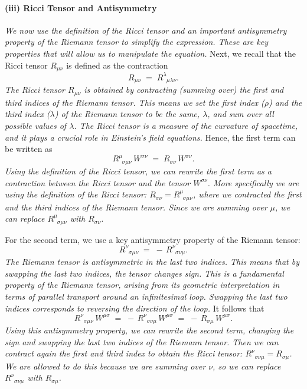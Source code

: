 \paragraph{(iii) Ricci Tensor and Antisymmetry}
\textit{We now use the definition of the Ricci tensor and an important antisymmetry property of the Riemann tensor to simplify the expression. These are key properties that will allow us to manipulate the equation.}
Next, we recall that the Ricci tensor $R_{\mu\nu}$ is defined as the contraction
\[
R_{\mu\nu} \;=\; R^\lambda_{\;\;\mu\lambda\nu}.
\]
\textit{The Ricci tensor \(R_{\mu\nu}\) is obtained by contracting (summing over) the first and third indices of the Riemann tensor. This means we set the first index (\(\rho\)) and the third index (\(\lambda\)) of the Riemann tensor to be the same, \(\lambda\), and sum over all possible values of \(\lambda\). The Ricci tensor is a measure of the curvature of spacetime, and it plays a crucial role in Einstein's field equations.}
Hence, the first term can be written as
\[
R^\mu_{\;\;\sigma\mu\nu}\,W^{\sigma\nu}
\;=\;
R_{\sigma\nu}\,W^{\sigma\nu}.
\]
\textit{Using the definition of the Ricci tensor, we can rewrite the first term as a contraction between the Ricci tensor and the tensor \(W^{\sigma\nu}\). More specifically we are using the definition of the Ricci tensor: \(R_{\sigma\nu} = R^\mu_{\;\;\sigma\mu\nu}\), where we contracted the first and the third indices of the Riemann tensor. Since we are summing over \(\mu\), we can replace \(R^\mu_{\;\;\sigma\mu\nu}\) with \(R_{\sigma\nu}\).}

For the second term, we use a key antisymmetry property of the Riemann tensor:
\[
R^\nu_{\;\;\sigma\mu\nu}
\;=\;
-\,R^\nu_{\;\;\sigma\nu\mu}.
\]
\textit{The Riemann tensor is antisymmetric in the last two indices. This means that by swapping the last two indices, the tensor changes sign. This is a fundamental property of the Riemann tensor, arising from its geometric interpretation in terms of parallel transport around an infinitesimal loop. Swapping the last two indices corresponds to reversing the direction of the loop.}
It follows that
\[
R^\nu_{\;\;\sigma\mu\nu}\,W^{\mu\sigma}
\;=\;
-\,R^\nu_{\;\;\sigma\nu\mu}\,W^{\mu\sigma}
\;=\;
-\,R_{\sigma\mu}\,W^{\mu\sigma}.
\]
\textit{Using this antisymmetry property, we can rewrite the second term, changing the sign and swapping the last two indices of the Riemann tensor. Then we can contract again the first and third index to obtain the Ricci tensor: \(R^\nu_{\;\;\sigma\nu\mu} = R_{\sigma\mu}\). We are allowed to do this because we are summing over \(\nu\), so we can replace \(R^\nu_{\;\;\sigma\nu\mu}\) with \(R_{\sigma\mu}\).}

